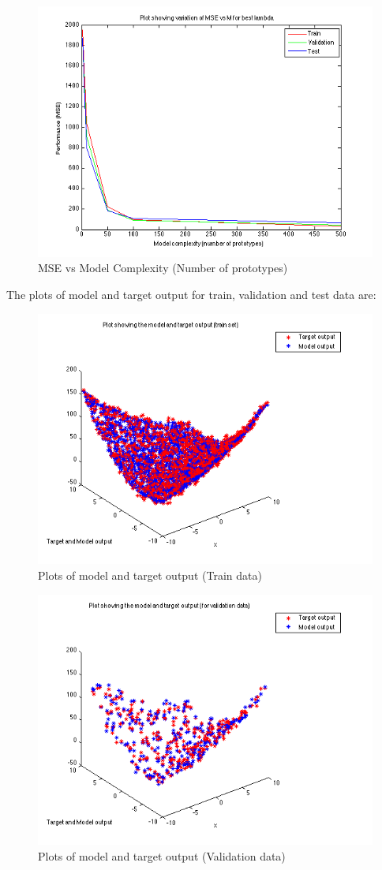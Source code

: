 \documentclass{article}
\begin{document}
\begin{figure}[H]
\centering
\includegraphics[width=0.8\linewidth]{Regression/rbfnn_bivariate/mse_m.png}
\caption{MSE vs Model Complexity (Number of prototypes)}
\end{figure}

The plots of model and target output for train, validation and test data are:

\begin{figure}[H]
\centering
\includegraphics[width=0.5\linewidth]{Regression/rbfnn_bivariate/output_train.png}
\caption{Plots of model and target output (Train data)}
\end{figure}

\begin{figure}[H]
\centering
\includegraphics[width=0.5\linewidth]{Regression/rbfnn_bivariate/output_val.png}
\caption{Plots of model and target output (Validation data)}
\end{figure}
\end{document}
